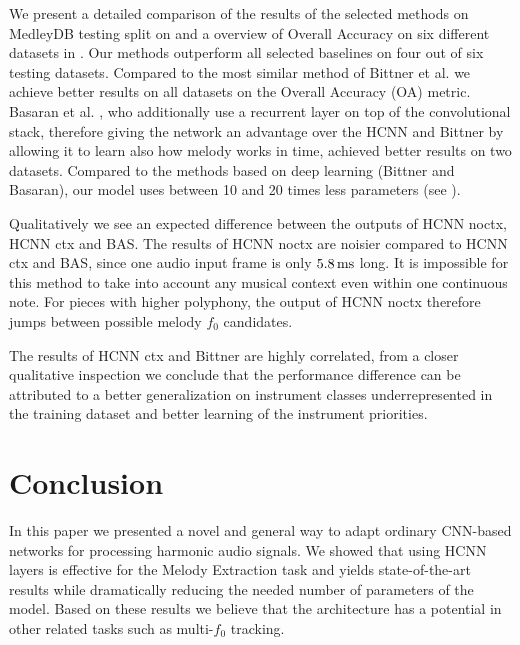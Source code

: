 \documentclass{article}
\begin{document}
We present a detailed comparison of the results of the selected methods on MedleyDB testing split on  and a overview of Overall Accuracy on six different datasets in . Our methods outperform all selected baselines on four out of six testing datasets. Compared to the most similar method of Bittner et al. \cite{Bittner2017} we achieve better results on all datasets on the Overall Accuracy (OA) metric. Basaran et al. \cite{DBasaranSEssid2018}, who additionally use a recurrent layer on top of the convolutional stack, therefore giving the network an advantage over the HCNN and Bittner by allowing it to learn also how melody works in time, achieved better results on two datasets. Compared to the methods based on deep learning (Bittner and Basaran), our model uses between 10 and 20 times less parameters (see ).

Qualitatively we see an expected difference between the outputs of HCNN noctx, HCNN ctx and BAS. The results of HCNN noctx are noisier compared to HCNN ctx and BAS, since one audio input frame is only $5.8\,\rm ms$ long. It is impossible for this method to take into account any musical context even within one continuous note. For pieces with higher polyphony, the output of HCNN noctx therefore jumps between possible melody $f_0$ candidates.

The results of HCNN ctx and Bittner are highly correlated, from a closer qualitative inspection we conclude that the performance difference can be attributed to a better generalization on instrument classes underrepresented in the training dataset and better learning of the instrument priorities.

\section{Conclusion}

In this paper we presented a novel and general way to adapt ordinary CNN-based networks for processing harmonic audio signals. We showed that using HCNN layers is effective for the Melody Extraction task and yields state-of-the-art results while dramatically reducing the needed number of parameters of the model. Based on these results we believe that the architecture has a potential in other related tasks such as multi-$f_0$ tracking.
\end{document}
